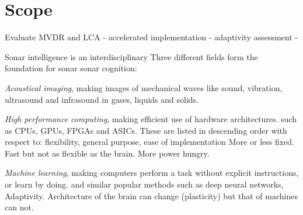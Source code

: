 
%
%

\section{Scope}






Evaluate MVDR and LCA 
- accelerated implementation
- adaptivity assessment
- 

Sonar intelligence is an interdisciplinary 
Three different fields form the foundation for sonar sonar cognition:

\emph{Acoustical imaging}, making images of mechanical waves like sound, vibration, ultrasound and infrasound in gases, liquids and solids.

\emph{High performance computing}, making efficient use of hardware architectures.  such as CPUs, GPUs, FPGAs and ASICs. These are listed in descending order with respect to: flexibility, general purpose, ease of implementation  More or less fixed. Fast but not as flexible as the brain. More power hungry. 

\emph{Machine learning}, making computers perform a task without explicit instructions, or learn by doing. and similar popular methods such as deep neural networks, Adaptivity. Architecture of the brain can change (plasticity) but that of machines can not. 



